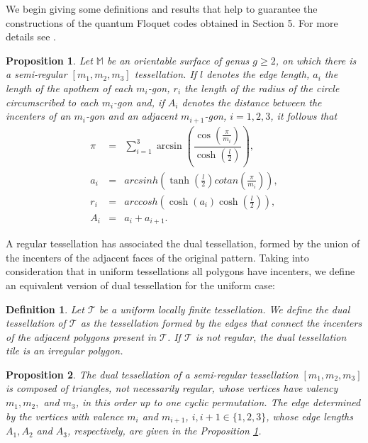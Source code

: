 \documentclass[%
reprint,
amsmath,amssymb,
aps,
]{revtex4-2}
\newtheorem{proposition}{Proposition}%
\newtheorem{definition}{Definition}
\newcommand{\tes}{\mathcal{T}}
\newcommand{\M}{\mathbb{M}}
\begin{document}
We begin giving some definitions and results that help to guarantee the constructions of the quantum Floquet codes obtained in Section 5. For more details see \cite{artigo-giovana}.

\begin{proposition} \label{propo:ao-teo-kulkarni-r-valente-medidas} 
	Let $ \M $ be an orientable surface of genus $ g \geq 2$, on which there is a semi-regular $[m_1,m_2, m_3]$ tessellation. If $l$ denotes the edge length, $a_i$ the length of the apothem of each $m_i$-gon, $ r_i $ the length of the radius of the circle circumscribed to each $ m_i $-gon and, if $ A_i $ denotes the distance between the incenters of an $m_i$-gon and an adjacent $ m_{i+1} $-gon, $i = 1,2,3$, it follows that
	\begin{eqnarray}
		\pi &=& 	\displaystyle\sum_{i=1}^3 \arcsin\displaystyle\left(  \dfrac{\cos\displaystyle\left( \frac{\pi}{m_i}\right)}{\cosh\displaystyle\left(  \frac{l}{2}\right)}\right), 			\label{eq:teorema-tesselacoes-eq-giovana-para-lado-da-tesselacao} \\  %
		a_i&=&   arcsinh\displaystyle\left(  \tanh\displaystyle\left( \frac{l}{2}\right) cotan \displaystyle\left( \frac{\pi}{m_i}\right)\right), \\
		r_i&=&    arccosh\displaystyle\left(  \cosh\displaystyle\left(  a_i\right) \cosh\displaystyle\left( \frac{l}{2}\right) \right), \\
		A_i&=&   a_i+a_{i+1}.
	\end{eqnarray}
\end{proposition}

A regular tessellation has associated the dual tessellation, formed by the union of the incenters of the adjacent faces of the original pattern. Taking into consideration that in uniform tessellations all polygons have incenters, we define an equivalent version of dual tessellation for the uniform case:

\begin{definition}
	Let $\tes$ be a uniform locally finite tessellation. We define the dual tessellation of $\tes$ as the tessellation formed by the edges that connect the incenters of the adjacent polygons present in $\tes$. If $\tes$ is not regular, the dual tessellation tile is an irregular polygon. 
\end{definition}

\begin{proposition} 
	The dual tessellation of a semi-regular tessellation $[m_1,m_2,m_3]$ is composed of triangles, not necessarily regular, whose vertices have valency $m_1,m_2,$ and $m_3$, in this order up to one cyclic permutation. The edge determined by the vertices with valence $ m_i $ and $ m_{i+1} $, $i, i+1 \in \{1,2,3\}$, whose edge lengths $ A_1, A_2$ and $A_3$, respectively, are given in the Proposition \ref{propo:ao-teo-kulkarni-r-valente-medidas}.
\end{proposition}
\end{document}
